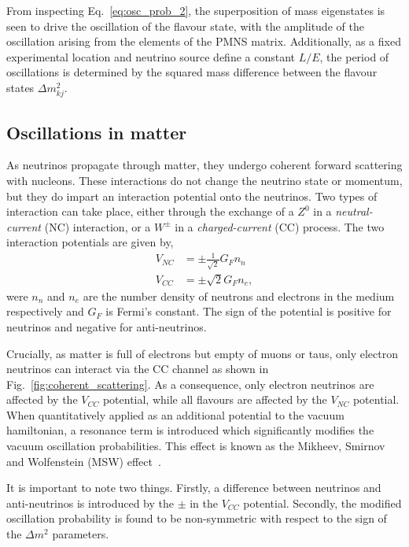 From inspecting Eq.~\ref{eq:osc_prob_2}, the superposition of mass eigenstates is seen to drive
the oscillation of the flavour state, with the amplitude of the oscillation arising from the
elements of the PMNS matrix. Additionally, as a fixed experimental location and neutrino source
define a constant $L/E$, the period of oscillations is determined by the squared mass difference
between the flavour states $\Delta m_{kj}^{2}$.

\subsection{Oscillations in matter} %
\label{sec:theory_oscillations_matter} %

As neutrinos propagate through matter, they undergo coherent forward scattering with nucleons.
These interactions do not change the neutrino state or momentum, but they do impart an interaction
potential onto the neutrinos. Two types of interaction can take place, either through the exchange
of a $Z^{0}$ in a \emph{neutral-current} (NC) interaction, or a $W^{\pm}$ in a
\emph{charged-current} (CC) process. The two interaction potentials are given by,
\begin{align} %
    V_{NC} & = \pm\frac{1}{\sqrt{2}}G_{F}n_{n} \\
    V_{CC} & = \pm\sqrt{2}G_{F}n_{e},
\end{align}
were $n_{n}$ and $n_{e}$ are the number density of neutrons and electrons in the medium
respectively and $G_{F}$ is Fermi's constant. The sign of the potential is positive for neutrinos
and negative for anti-neutrinos.

Crucially, as matter is full of electrons but empty of muons or taus, only electron neutrinos can
interact via the CC channel as shown in Fig.~\ref{fig:coherent_scattering}. As a consequence, only
electron neutrinos are affected by the $V_{CC}$ potential, while all flavours are affected by the
$V_{NC}$ potential. When quantitatively applied as an additional potential to the vacuum
hamiltonian, a resonance term is introduced which significantly modifies the vacuum oscillation
probabilities. This effect is known as the Mikheev, Smirnov and Wolfenstein (MSW)
effect~\cite{wolfenstein1978, mikheev1986}.

It is important to note two things. Firstly, a difference between neutrinos and anti-neutrinos is
introduced by the $\pm$ in the $V_{CC}$ potential. Secondly, the modified oscillation probability
is found to be non-symmetric with respect to the sign of the $\Delta m^{2}$ parameters.

